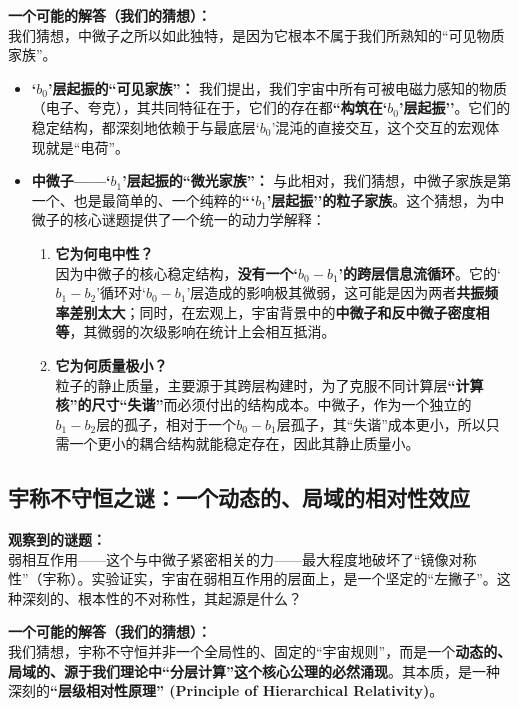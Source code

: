 \documentclass[12pt]{article}
\begin{document}
\noindent\textbf{一个可能的解答（我们的猜想）：}\\
我们猜想，中微子之所以如此独特，是因为它根本不属于我们所熟知的``可见物质家族''。

\begin{itemize}
    \item \textbf{`$b_0$'层起振的``可见家族''：} 我们提出，我们宇宙中所有可被电磁力感知的物质（电子、夸克），其共同特征在于，它们的存在都\textbf{``构筑在`$b_0$'层起振''}。它们的稳定结构，都深刻地依赖于与最底层`$b_0$'混沌的直接交互，这个交互的宏观体现就是``电荷''。

    \item \textbf{中微子——`$b_1$'层起振的``微光家族''：} 与此相对，我们猜想，中微子家族是第一个、也是最简单的、一个纯粹的\textbf{```$b_1$'层起振''的粒子家族}。这个猜想，为中微子的核心谜题提供了一个统一的动力学解释：
    \begin{enumerate}
        \item \textbf{它为何电中性？} \\
        因为中微子的核心稳定结构，\textbf{没有一个`$b_0-b_1$'的跨层信息流循环}。它的`$b_1-b_2$'循环对`$b_0-b_1$'层造成的影响极其微弱，这可能是因为两者\textbf{共振频率差别太大}；同时，在宏观上，宇宙背景中的\textbf{中微子和反中微子密度相等}，其微弱的次级影响在统计上会相互抵消。

        \item \textbf{它为何质量极小？} \\
		粒子的静止质量，主要源于其跨层构建时，为了克服不同计算层\textbf{``计算核''的尺寸``失谐''}而必须付出的结构成本。中微子，作为一个独立的$b_1-b_2$层的孤子，相对于一个$b_0-b_1$层孤子，其``失谐''成本更小，所以只需一个更小的耦合结构就能稳定存在，因此其静止质量小。
    \end{enumerate}
\end{itemize}

\subsection{宇称不守恒之谜：一个动态的、局域的相对性效应}

\noindent\textbf{观察到的谜题：}\\
弱相互作用——这个与中微子紧密相关的力——最大程度地破坏了``镜像对称性''（宇称）。实验证实，宇宙在弱相互作用的层面上，是一个坚定的``左撇子''。这种深刻的、根本性的不对称性，其起源是什么？

\noindent\textbf{一个可能的解答（我们的猜想）：}\\
我们猜想，宇称不守恒并非一个全局性的、固定的``宇宙规则''，而是一个\textbf{动态的、局域的、源于我们理论中``分层计算''这个核心公理的必然涌现}。其本质，是一种深刻的\textbf{``层级相对性原理'' (Principle of Hierarchical Relativity)}。
\end{document}
